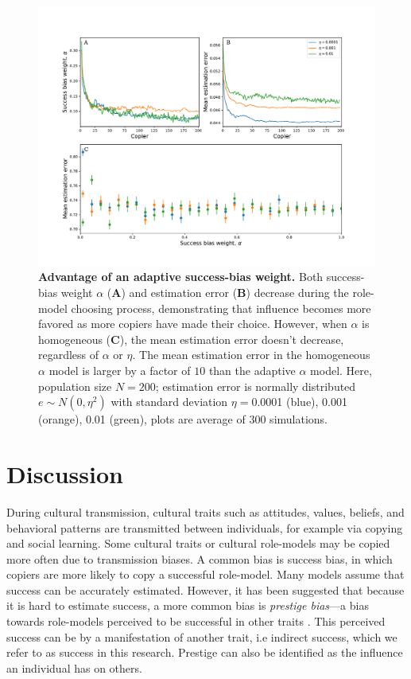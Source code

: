 \documentclass[12pt]{extarticle}
\begin{document}
\begin{figure}[h]
    \includegraphics[width=\linewidth]{../figures/final/choose_bias.pdf}
  \caption{
  \textbf{Advantage of an adaptive success-bias weight.}
  Both success-bias weight $\alpha$ (\textbf{A}) and estimation error (\textbf{B}) decrease during the role-model choosing process, demonstrating that influence becomes more favored as more copiers have made their choice.
However, when $\alpha$ is homogeneous (\textbf{C}), the mean estimation error doesn't decrease, regardless of $\alpha$ or $\eta$.
The mean estimation error in the homogeneous $\alpha$ model is larger by a factor of $10$ than the adaptive $\alpha$ model.
Here, population size $N=200$; estimation error is normally distributed $e \sim N(0,\eta^2)$ with standard deviation $\eta=$0.0001 (blue), 0.001 (orange), 0.01 (green), plots are average of $300$ simulations.}	
  \label{fig:influence_advantage}
\end{figure}



\section*{Discussion}
During cultural transmission, cultural traits such as attitudes, values, beliefs, and behavioral patterns are transmitted between individuals, for example via copying and social learning.
Some cultural traits or cultural role-models may be copied more often due to transmission biases. 
A common bias is success bias, in which copiers are more likely to copy a successful role-model. Many models assume that success can be accurately estimated.
However, it has been suggested that because it is hard to estimate success, a more common bias is \emph{prestige bias}---a bias towards role-models perceived to be successful in other traits \citep{fijian_social_bias}. This perceived success can be by a manifestation of another trait, i.e indirect success, which we refer to as success in this research. Prestige can also be identified as the influence an individual has on others.
\end{document}
